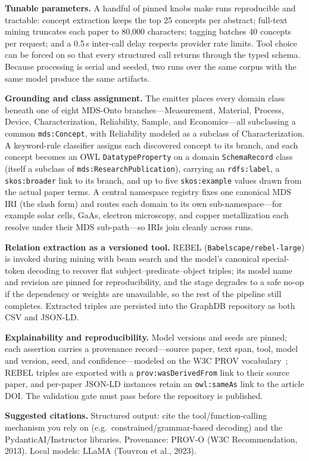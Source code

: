 \documentclass[Afour,sageh,times]{sagej}
\newcommand{\readingnote}[1]{%
  \par\smallskip\noindent\colorbox{gray!12}{%
  \parbox{\dimexpr\linewidth-2\fboxsep}{\footnotesize\textbf{Suggested citations.} #1}}\par}
\begin{document}
\textbf{Tunable parameters.} A handful of pinned knobs make runs reproducible and tractable:
concept extraction keeps the top 25 concepts per abstract; full-text mining truncates each paper to
80{,}000 characters; tagging batches 40 concepts per request; and a 0.5\,s inter-call delay respects
provider rate limits. Tool choice can be forced on so that every structured call returns through the
typed schema. Because processing is serial and seeded, two runs over the same corpus with the same
model produce the same artifacts.

\textbf{Grounding and class assignment.} The emitter places every domain class beneath one of eight
MDS-Onto branches---Measurement, Material, Process, Device, Characterization, Reliability, Sample, and
Economics---all subclassing a common \texttt{mds:Concept}, with Reliability modeled as a subclass of
Characterization. A keyword-rule classifier assigns each discovered concept to its branch, and each
concept becomes an OWL \texttt{DatatypeProperty} on a domain \texttt{SchemaRecord} class (itself a
subclass of \texttt{mds:ResearchPublication}), carrying an \texttt{rdfs:label}, a \texttt{skos:broader}
link to its branch, and up to five \texttt{skos:example} values drawn from the actual paper terms. A
central namespace registry fixes one canonical MDS IRI (the slash form) and routes each domain to its
own sub-namespace---for example solar cells, GaAs, electron microscopy, and copper metallization each
resolve under their MDS sub-path---so IRIs join cleanly across runs.

\textbf{Relation extraction as a versioned tool.} REBEL (\texttt{Babelscape/rebel-large}) is invoked
during mining with beam search and the model's canonical special-token decoding to recover flat
subject--predicate--object triples; its model name and revision are pinned for reproducibility, and the
stage degrades to a safe no-op if the dependency or weights are unavailable, so the rest of the pipeline
still completes. Extracted triples are persisted into the GraphDB repository as both CSV and JSON-LD.

\textbf{Explainability and reproducibility.} Model versions and seeds are pinned; each assertion
carries a provenance record---source paper, text span, tool, model and version, seed, and
confidence---modeled on the W3C PROV vocabulary~\cite{provo}; REBEL triples are exported with a
\texttt{prov:wasDerivedFrom} link to their source paper, and per-paper JSON-LD instances retain an
\texttt{owl:sameAs} link to the article DOI. The validation gate must pass before the repository is
published.
\readingnote{Structured output: cite the tool/function-calling mechanism you rely on (e.g.\
constrained/grammar-based decoding) and the PydanticAI/Instructor libraries. Provenance: PROV-O
(W3C Recommendation, 2013). Local models: LLaMA (Touvron et al., 2023).}
\end{document}
